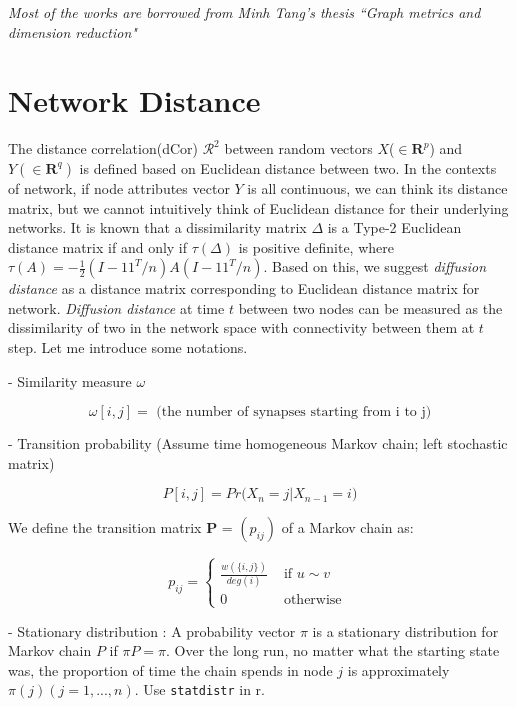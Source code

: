 \documentclass[12pt]{report}
\begin{document}






\doublespace


\sffamily
\normalsize
\textit{Most of the works are borrowed from Minh Tang's thesis ``Graph metrics and dimension reduction"}

\section{Network Distance}

 The distance correlation(dCor) $\mathcal{R}^2$ between random vectors $X$($\in \textbf{R}^{p}$) and $Y(\in \textbf{R}^{q})$ is defined based on Euclidean distance between two. In the contexts of network, if node attributes vector $Y$ is all continuous, we can think its distance matrix, but we cannot intuitively think of Euclidean distance for their underlying networks. It is known that a dissimilarity matrix $\Delta$ is a Type-2 Euclidean distance matrix if and only if $\tau(\Delta)$ is positive definite, where $\tau(A) = -\frac{1}{2}(I - 1 1^{T} / n) A (I - 1 1^{T} / n).$ Based on this, we suggest \textit{diffusion distance} as a distance matrix corresponding to Euclidean distance matrix for network. \textit{Diffusion distance} at time $t$ between two nodes can be measured as the dissimilarity of two in the network space with connectivity between them at $t$ step. Let me introduce some notations. 
 
 - Similarity measure $\omega$

$$\omega[i,j] = \mbox{ (the number of synapses starting from i to j)}$$
 

- Transition probability (Assume time homogeneous Markov chain; left stochastic matrix)

$$P[i,j] = Pr\big( X_{n} = j  | X_{n-1} = i \big)$$

We define the transition matrix \textbf{P} = $(p_{ij})$ of a Markov chain as:

$$p_{ij} = \left\{ \begin{array}{ll} \frac{w(\{ i, j\})}{ deg(i) } & \mbox{ if } u \sim v \\ 0 & \mbox{ otherwise }  \end{array}  \right.$$

- Stationary distribution 
: A probability vector $\pi$ is a stationary distribution for Markov chain $P$ if $\pi P = \pi$. Over the long run, no matter what the starting state was, the proportion of time the chain spends in node $j$ is approximately $\pi(j) (j = 1, ... , n)$.
Use \verb!statdistr! in r.
  
\end{document}
